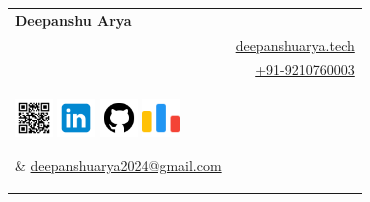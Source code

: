 \documentclass[a4paper,11pt]{article}
\makeatletter
\newcommand{\name}{Deepanshu Arya} %
\newcommand{\phone}{9210760003} %
\newcommand{\emaila}{deepanshuarya2024@gmail.com} %
\makeatother
\begin{document}



\parbox{\dimexpr\linewidth-2.8cm\relax}{
	\vspace{8mm}
	\begin{tabularx}{\linewidth}{l r}  %
		\textbf{\huge \name} & \\  %
		{} & \raisebox{0.0\height}{\footnotesize \faLink} \href{https://deepanshuarya.tech/}{deepanshuarya.tech} \\
		{} & \raisebox{0.0\height}{\footnotesize \faPhone} \href{callto:+91-\phone}{+91-\phone} \\  %
		\parbox{12cm}{  %
			\flushleft
			\vspace{-16mm}  %
			\href{https://deepanshuarya.tech/}{\includegraphics[width=1cm,clip]{frame.png}}
			\hspace{0.5em}
			\href{https://www.linkedin.com/in/deepanshuarya2024/}{\includegraphics[width=1cm,clip]{icons8-linked-in-480.png}}
			\hspace{0.5em}
			\href{https://github.com/sudo-arya/}{\includegraphics[width=1cm,clip]{icons8-github-480.png}}
			\hspace{0.5em}
			\href{https://codeforces.com/profile/TLE_lord}{\includegraphics[width=1cm,clip]{codeforces.png}}
			
		} & \href{mailto:\emaila}{\raisebox{0.0\height}{\footnotesize \faEnvelope} \emaila} \\
	\end{tabularx}
}

\vspace{-6.5mm}
\end{document}
